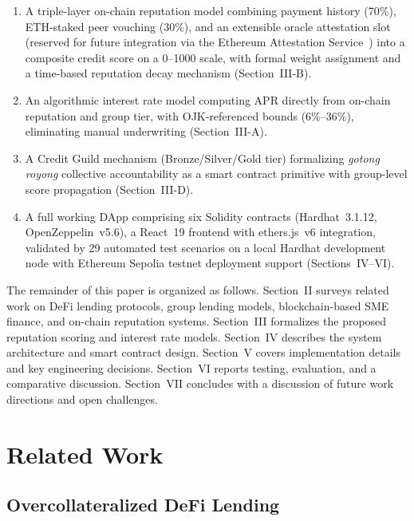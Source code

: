 \documentclass[conference]{IEEEtran}
\begin{document}
\begin{enumerate}
\item A triple-layer on-chain reputation model combining payment history
(70\%), ETH-staked peer vouching (30\%), and an extensible oracle attestation
slot (reserved for future integration via the Ethereum Attestation
Service~\cite{b6}) into a composite credit score on a 0--1000 scale, with
formal weight assignment and a time-based reputation decay mechanism
(Section~III-B).

\item An algorithmic interest rate model computing APR directly from on-chain
reputation and group tier, with OJK-referenced bounds (6\%--36\%), eliminating
manual underwriting (Section~III-A).

\item A Credit Guild mechanism (Bronze/Silver/Gold tier) formalizing
\textit{gotong royong} collective accountability as a smart contract primitive
with group-level score propagation (Section~III-D).

\item A full working DApp comprising six Solidity contracts (Hardhat~3.1.12,
OpenZeppelin~v5.6), a React~19 frontend with ethers.js~v6 integration,
validated by 29 automated test scenarios on a local Hardhat development node
with Ethereum Sepolia testnet deployment support (Sections~IV--VI).
\end{enumerate}

The remainder of this paper is organized as follows.
Section~II surveys related work on DeFi lending protocols, group lending
models, blockchain-based SME finance, and on-chain reputation systems.
Section~III formalizes the proposed reputation scoring and interest rate
models. Section~IV describes the system architecture and smart contract
design. Section~V covers implementation details and key engineering decisions.
Section~VI reports testing, evaluation, and a comparative discussion.
Section~VII concludes with a discussion of future work directions and
open challenges.

\section{Related Work}

\subsection{Overcollateralized DeFi Lending}
\end{document}
